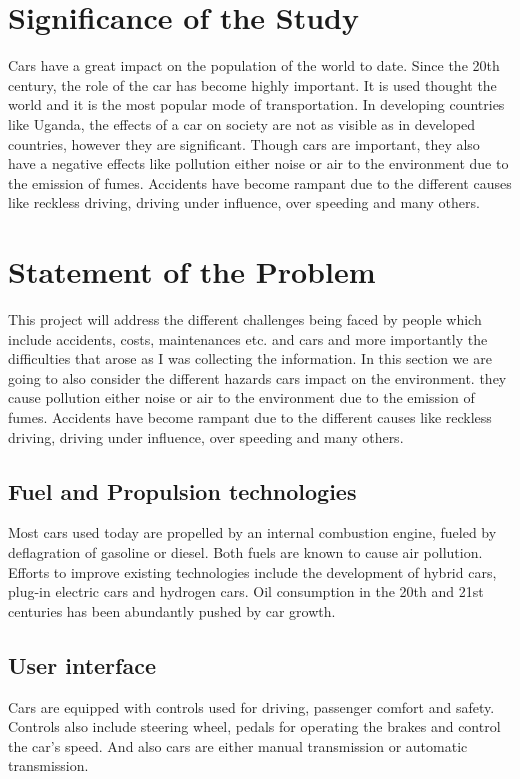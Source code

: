 \documentclass[12]{article}
\begin{document}
\section{Significance of the Study}
Cars have a great impact on the population of the world to date. Since the 20th century, the role of the car has become highly important. It is used thought the world and it is the most popular mode of transportation. In developing countries like Uganda, the effects of a car on society are not as visible as in developed countries, however they are significant. 
Though cars are important, they also have a negative effects like pollution either noise or air to the environment due to the emission of fumes. Accidents have become rampant due to the different causes like reckless driving, driving under influence, over speeding and many others.

\section{Statement of the Problem}
This project will address the different challenges being faced by people which include accidents, costs, maintenances etc. and cars and more importantly the difficulties that arose as I was collecting the information.
In this section we are going to also consider the different hazards cars impact on the environment. they cause pollution either noise or air to the environment due to the emission of fumes. Accidents have become rampant due to the different causes like reckless driving, driving under influence, over speeding and many others.

\subsection{Fuel and Propulsion technologies}
Most cars used today are propelled by an internal combustion engine, fueled by deflagration of gasoline or diesel. Both fuels are known to cause air pollution. Efforts to improve existing technologies include the development of hybrid cars, plug-in electric cars and hydrogen cars. Oil consumption in the 20th and 21st centuries has been abundantly pushed by car growth.

\subsection{User interface}
Cars are equipped with controls used for driving, passenger comfort and safety. Controls also include steering wheel, pedals for operating the brakes and control the car’s speed. And also cars are either manual transmission or automatic transmission.
\end{document}
